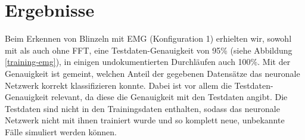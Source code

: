 \documentclass[11pt]{scrartcl}
\begin{document}


	\section{Ergebnisse}

	Beim Erkennen von Blinzeln mit EMG (Konfiguration 1) erhielten wir, sowohl mit als auch ohne FFT, eine Testdaten-Genauigkeit von 95\% (siehe Abbildung \ref{training-emg}), in einigen undokumentierten Durchläufen auch 100\%. Mit der Genauigkeit ist gemeint, welchen Anteil der gegebenen Datensätze das neuronale Netzwerk korrekt klassifizieren konnte. Dabei ist vor allem die Testdaten-Genauigkeit relevant, da diese die Genauigkeit mit den Testdaten angibt. Die Testdaten sind nicht in den Trainingsdaten enthalten, sodass das neuronale Netzwerk nicht mit ihnen trainiert wurde und so komplett neue, unbekannte Fälle simuliert werden können.

	\begin{figure}[H]
	\end{figure}
\end{document}
